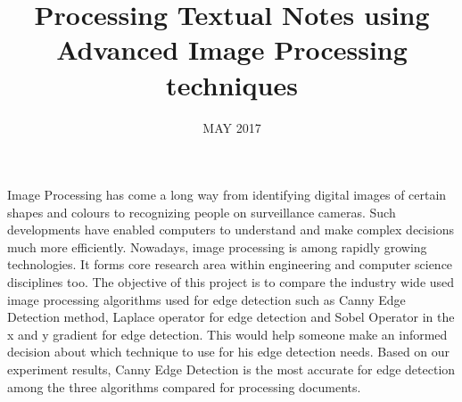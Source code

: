 \documentclass[BTech]{srmuthesis}
\begin{document}

\title{Processing Textual Notes using Advanced Image Processing techniques} %

\firstauthorregno{[Reg No: 1081310154]}
\secondauthorregno{[Reg No: 1081310234]}
\thirdauthorregno{[Reg No: 1081310257]}
 \fourthauthor{}
 \fourthauthorregno{}
 \fifthauthor{}
 \fifthauthorregno{}
\date{MAY 2017} %

\maketitle
\certificate





\abstract
\begin{doublespacing}
{\large\noindent Image Processing has come a long way from identifying digital images of certain shapes and colours to recognizing people on surveillance cameras. Such developments have enabled computers to understand and make complex decisions much more efficiently. Nowadays, image processing is among rapidly
growing technologies. It forms core research area within engineering and computer science disciplines too. The objective of this project is to compare the industry wide used image processing algorithms used for edge detection such as Canny Edge Detection method, Laplace operator for edge detection and Sobel Operator in the x and y gradient for edge detection. This would help someone make an informed decision about which technique to use for his edge detection needs. Based on our experiment results, Canny Edge Detection is the most accurate for edge detection among the three algorithms compared for processing documents.}

\end{doublespacing}
\end{document}
